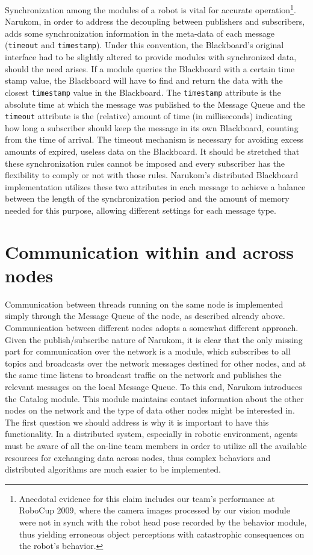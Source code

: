 Synchronization among the modules of a robot is vital for accurate operation\footnote[2]{Anecdotal evidence for this claim includes our team's performance at RoboCup 2009, where the camera images processed by our vision module were not in synch with the robot head pose recorded by the behavior module, thus yielding erroneous object perceptions with catastrophic consequences on the robot's behavior.}. Narukom, in order to address the decoupling between publishers and subscribers, adds some synchronization information in the meta-data of each message ({\tt timeout} and {\tt timestamp}). Under this convention, the Blackboard's original interface had to be slightly altered to provide modules with synchronized data, should the need arises. If a module queries the Blackboard with a certain time stamp value, the Blackboard will have to find and return the data with the closest {\tt timestamp} value in the Blackboard. The {\tt timestamp} attribute is the absolute time at which the message was published to the Message Queue and the {\tt timeout} attribute is the (relative) amount of time (in milliseconds) indicating how long a subscriber should keep the message in its own Blackboard, counting from the time of arrival. The timeout mechanism is necessary for avoiding excess amounts of expired, useless data on the Blackboard. It should be stretched that these synchronization rules cannot be imposed and every subscriber has the flexibility to comply or not with those rules. Narukom's distributed
Blackboard implementation utilizes these two attributes in each message to achieve a balance between the length of the
synchronization period and the amount of memory needed for this purpose, allowing different settings for each message type.


\section{Communication within and across nodes}

Communication between threads running on the same node is implemented simply through the Message Queue of the node, as described already above. Communication between different nodes adopts a somewhat different approach. Given the publish/subscribe nature of Narukom, it is clear that the only missing part for communication over the network is a module, which subscribes to all topics and broadcasts over the network messages destined for other nodes, and at the
same time listens to broadcast traffic on the network and publishes the relevant messages on the local Message Queue. To this end, Narukom introduces the Catalog module. This module maintains contact information about the other nodes on the network and the type of data other nodes might be interested in. The first question we should address is why it is important to have this functionality. In a distributed system, especially in robotic environment, agents must be aware of all the on-line team members in order to utilize all the available resources for exchanging data across nodes, thus complex behaviors and distributed algorithms are much easier to be implemented.

